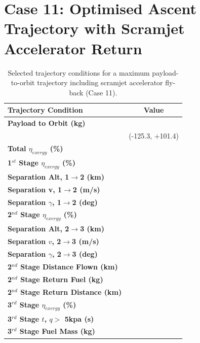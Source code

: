 \section{Case 11: Optimised Ascent Trajectory with Scramjet Accelerator Return}\label{sec:case11}
\begin{table}[ht] %
	\centering
\begin{tabular}{l c } 
	\hline \textbf{Trajectory Condition}
	&Value 
	\\
	\hline \textbf{Payload to Orbit (kg)}
	& \textbf{\PayloadToOrbitStandard}
	\\
	& \small(-125.3, +101.4)
	\\
	\textbf{Total $\eta_{exergy}$ (\%)}
	& \textbf{\totalExergyEffStandard}
	\\
	\hline 
	\textbf{1$^{st}$ Stage $\eta_{exergy}$ (\%)}
	& \textbf{\firstExergyEffStandard}
	\\

	\textbf{Separation Alt, 1$\rightarrow$2 (km)}
	& \firstsecondSeparationAltStandard
	\\
	\textbf{Separation v, 1$\rightarrow$2 (m/s)}
	& \firstsecondSeparationvStandard
	\\
	\textbf{Separation $\gamma$, 1$\rightarrow$2 (deg)}
	& \firstsecondSeparationgammaStandard
	\\
	\hline 
	\textbf{2$^{nd}$ Stage $\eta_{exergy}$ (\%)}
	& \textbf{\secondExergyEffStandard}
	\\

	\textbf{Separation Alt, 2$\rightarrow$3 (km)}
	& \secondthirdSeparationAltStandard
	\\
	\textbf{Separation $v$, 2$\rightarrow$3 (m/s)}
	& \secondthirdSeparationvStandard
	\\
	\textbf{Separation $\gamma$, 2$\rightarrow$3 (deg)}
	& \secondthirdSeparationgammaStandard
	\\

	\textbf{2$^{nd}$ Stage Distance Flown (km)}
	& \SecondDistStandard
	\\
	\textbf{2$^{nd}$ Stage Return Fuel (kg)}
	& \returnFuelStandard
	\\
	\textbf{2$^{nd}$ Stage Return Distance (km)}
	& \returnDistStandard
	\\
	\hline 
	\textbf{3$^{rd}$ Stage $\eta_{exergy}$ (\%)}
	& \textbf{\thirddExergyEffStandard}
	\\

	\textbf{3$^{rd}$ Stage $t$, $q >$ 5kpa (s)}
	& \thirdqOverFiveStandard
	\\
	\textbf{3$^{rd}$ Stage Fuel Mass (kg)}
	& \thirdmFuelStandard
	\\
	\hline 
\end{tabular} 
\caption{Selected trajectory conditions for a maximum payload-to-orbit trajectory including scramjet accelerator fly-back (Case 11).}
\end{table}

